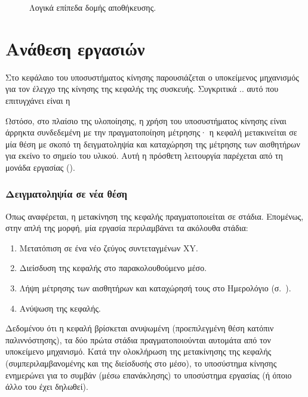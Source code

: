 \begin{figure}
    \caption{Λογικά επίπεδα δομής αποθήκευσης.\label{fig:log:structure}}
    \begin{center}%
    \def\svgwidth{0.7\textwidth}
    
    \end{center}
\end{figure}


\section{Ανάθεση εργασιών}

Στο κεφάλαιο του υποσυστήματος κίνησης
παρουσιάζεται ο υποκείμενος μηχανισμός για τον έλεγχο της κίνησης της κεφαλής
της συσκευής. Συγκριτικά .. αυτό που επιτυγχάνει είναι η 


Ωστόσο, στο πλαίσιο της υλοποίησης, η χρήση του υποσυστήματος κίνησης είναι
άρρηκτα συνδεδεμένη με την πραγματοποίηση μέτρησης· η κεφαλή μετακινείται σε μία
θέση με σκοπό τη δειγματοληψία και καταχώρηση της μέτρησης των αισθητήρων για
εκείνο το σημείο του υλικού. Αυτή η πρόσθετη λειτουργία παρέχεται από τη μονάδα
εργασίας ().


\subsubsection{Δειγματοληψία σε νέα θέση}

Όπως αναφέρεται, %
η μετακίνηση της κεφαλής πραγματοποιείται σε στάδια. Επομένως, στην απλή της
μορφή, μία εργασία περιλαμβάνει τα ακόλουθα στάδια:
\begin{enumerate}
    \item Μετατόπιση σε ένα νέο ζεύγος συντεταγμένων XY.
    \item Διείσδυση της κεφαλής στο παρακολουθούμενο μέσο.
    \item Λήψη μέτρησης των αισθητήρων και καταχώρησή τους στο Ημερολόγιο
    (σ.~\pageref{sec:log}).
    \item Ανύψωση της κεφαλής.
\end{enumerate}

Δεδομένου ότι η κεφαλή βρίσκεται ανυψωμένη (προεπιλεγμένη θέση κατόπιν
παλιννόστησης), %
τα δύο πρώτα στάδια πραγματοποιούνται αυτομάτα από τον
υποκείμενο μηχανισμό. Κατά την ολοκλήρωση της μετακίνησης της κεφαλής
(συμπεριλαμβανομένης και της διείσδυσής στο μέσο), το υποσύστημα κίνησης
ενημερώνει για το συμβάν (μέσω επανάκλησης) το υποσύστημα εργασίας (ή όποιο άλλο
του έχει δηλωθεί).

